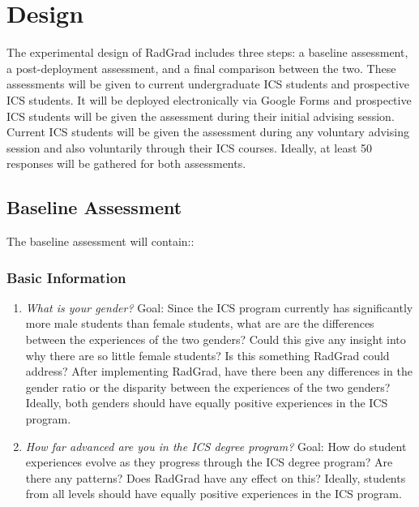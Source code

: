 \chapter{Design}
\label{design}
The experimental design of RadGrad includes three steps: a baseline assessment, a post-deployment assessment, and a final comparison between the two. These assessments will be given to current undergraduate ICS students and prospective ICS students. It will be deployed electronically via Google Forms and prospective ICS students will be given the assessment during their initial advising session. Current ICS students will be given the assessment during any voluntary advising session and also voluntarily through their ICS courses. Ideally, at least 50 responses will be gathered for both assessments.
\section{Baseline Assessment}
\label{baselineAssessment}
	The baseline assessment will contain::

\subsection{Basic Information}
\begin{enumerate}
\item \textit{What is your gender? }
Goal: Since the ICS program currently has significantly more male students than female students, what are are the differences between the experiences of the two genders? Could this give any insight into why there are so little female students? Is this something RadGrad could address? After implementing RadGrad, have there been any differences in the gender ratio or the disparity between the experiences of the two genders? Ideally, both genders should have equally positive experiences in the ICS program.
\item \textit{How far advanced are you in the ICS degree program?}
Goal: How do student experiences evolve as they progress through the ICS degree program? Are there any patterns? Does RadGrad have any effect on this? Ideally, students from all levels should have equally positive experiences in the ICS program. 
\end{enumerate}

